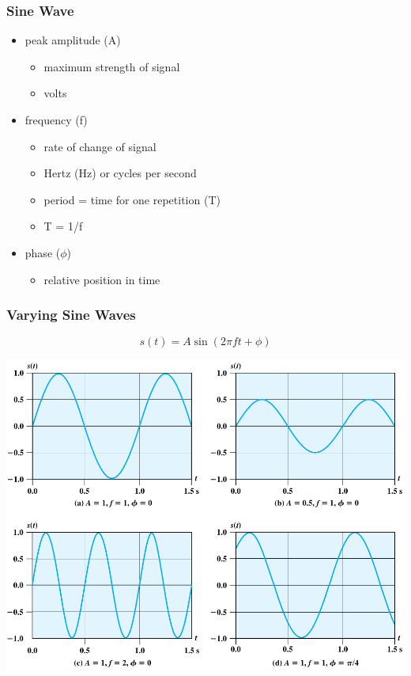 \documentclass[pdflatex,compress]{beamer}
\begin{document}
\begin{frame}
	\frametitle{Sine Wave}
	\begin{itemize}
		\item peak amplitude (A)
		\begin{itemize}
			\item maximum strength of signal
			\item volts
		\end{itemize}
		\item frequency (f)
		\begin{itemize}
			\item rate of change of signal
			\item Hertz (Hz) or cycles per second
			\item period = time for one repetition (T)
			\item T = 1/f
		\end{itemize}
		\item phase ($\phi$)
		\begin{itemize}
			\item relative position in time
		\end{itemize}
	\end{itemize}
\end{frame}

\begin{frame}
	\frametitle{Varying Sine Waves}
	\begin{equation*}
		s(t) = A \sin(2\pi ft + \phi)
	\end{equation*}
	\begin{center}
		\includegraphics[height=0.72\textheight]{img/img03}
	\end{center}
\end{frame}
\end{document}
